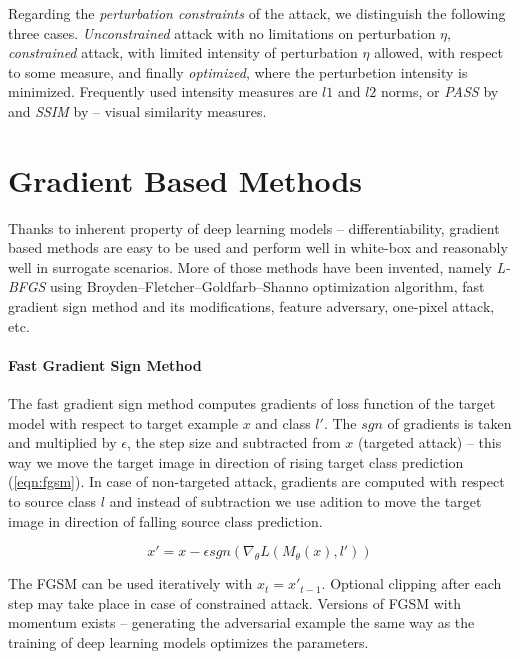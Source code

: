Regarding the \emph{perturbation constraints} of the attack, we distinguish the following three cases. \emph{Unconstrained} attack with no limitations on perturbation $\eta$, \emph{constrained} attack, with limited intensity of perturbation $\eta$ allowed, with respect to some measure, and finally \emph{optimized}, where the perturbetion intensity is minimized. Frequently used intensity measures are $l1$ and $l2$ norms, or \emph{PASS} by \cite{DBLP:journals/corr/RozsaRB16} and \emph{SSIM} by \cite{ssim} -- visual similarity measures.

\section{Gradient Based Methods}
\label{sec:advex_gbm}
Thanks to inherent property of deep learning models -- differentiability, gradient based methods are easy to be used and perform well in white-box and reasonably well in surrogate scenarios. More of those methods have been invented, namely \textit{L-BFGS} using Broyden–Fletcher–Goldfarb–Shanno optimization algorithm, fast gradient sign method and its modifications, feature adversary, one-pixel attack, etc.

\paragraph{Fast Gradient Sign Method}
\label{sec:fgsm}
The fast gradient sign method computes gradients of loss function of the target model  with respect to target example $x$ and class $l'$. The $sgn$ of gradients is taken and multiplied by $\epsilon$, the step size and subtracted from $x$ (targeted attack) -- this way we move the target image in direction of rising target class prediction (\ref{eqn:fgsm}). In case of non-targeted attack, gradients are computed with respect to source class $l$ and instead of subtraction we use adition to move the target image in direction of falling source class prediction.

\begin{equation} \label{eqn:fgsm}
x' = x - \epsilon sgn\left(\nabla_\theta L\left(M_\theta(x), l'\right)\right)
\end{equation}

The FGSM can be used iteratively with $x_t = x'_{t-1}$. Optional clipping after each step may take place in case of constrained attack. Versions of FGSM with momentum exists -- generating the adversarial example the same way as the training of deep learning models optimizes the parameters.

